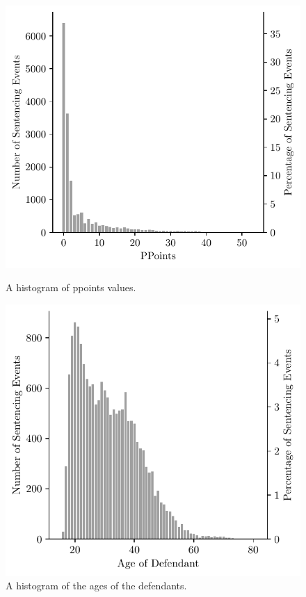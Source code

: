 \documentclass[11pt, oneside]{article}   	%
\theoremstyle{ModifiedStyle}
\begin{document}
%
\begin{figure}[h!]
	\centering
	\begin{minipage}{0.45\textwidth}
		\centering
		\hspace{-4mm}
		\includegraphics[scale=0.73]{Figures/PPoints_Histogram}
		\hspace{4mm}
		\vspace{-7mm}
		\caption{A histogram of ppoints values.}
		\label{Figure_Hester_Data_PPoints_Histogram}
	\end{minipage}
	\hspace*{5mm}
	\begin{minipage}{0.45\textwidth}
		\centering
		\hspace{-4mm}
		\includegraphics[scale=0.73]{Figures/Ages_Histogram}
		\hspace{4mm}
		\vspace{-7mm}
		\caption{A histogram of the ages of the defendants.}
		\label{Figure_Hester_Data_Age_Histogram}
	\end{minipage}
\end{figure}	
\end{document}
